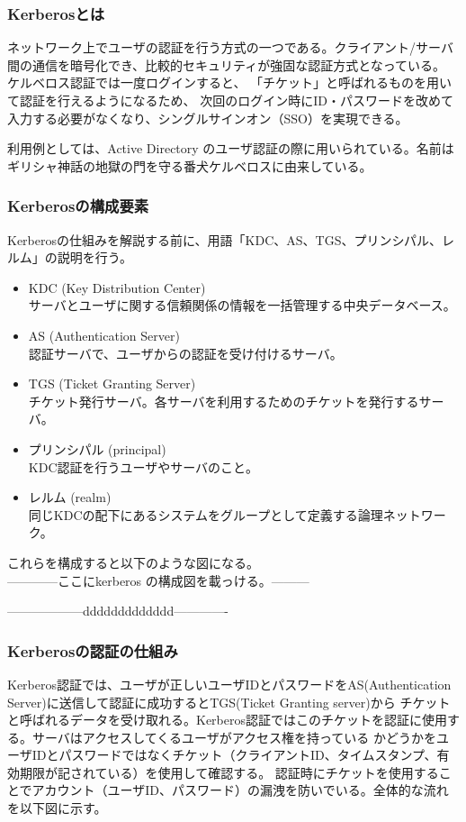 \documentclass[12pt,a4paper,titlepage]{jsarticle}
\begin{document}
\subsubsection*{Kerberosとは}
ネットワーク上でユーザの認証を行う方式の一つである。クライアント/サーバ間の通信を暗号化でき、比較的セキュリティが強固な認証方式となっている。
ケルベロス認証では一度ログインすると、
「チケット」と呼ばれるものを用いて認証を行えるようになるため、
次回のログイン時にID・パスワードを改めて入力する必要がなくなり、シングルサインオン（SSO）を実現できる。\par 
利用例としては、Active Directory のユーザ認証の際に用いられている。名前はギリシャ神話の地獄の門を守る番犬ケルベロスに由来している。

\subsubsection*{Kerberosの構成要素}
Kerberosの仕組みを解説する前に、用語「KDC、AS、TGS、プリンシパル、レルム」の説明を行う。

\begin{itemize}
    \item KDC (Key Distribution Center)\mbox{}\\サーバとユーザに関する信頼関係の情報を一括管理する中央データベース。
    \item AS (Authentication Server) \mbox{}\\認証サーバで、ユーザからの認証を受け付けるサーバ。
    \item TGS (Ticket Granting Server) \mbox{}\\チケット発行サーバ。各サーバを利用するためのチケットを発行するサーバ。
    \item プリンシパル (principal) \mbox{}\\ KDC認証を行うユーザやサーバのこと。
    \item レルム (realm)\mbox{}\\同じKDCの配下にあるシステムをグループとして定義する論理ネットワーク。
\end{itemize}
これらを構成すると以下のような図になる。
\\------------ここにkerberos の構成図を載っける。---------

------------------ddddddddddddd-------------

\subsubsection*{Kerberosの認証の仕組み}
Kerberos認証では、ユーザが正しいユーザIDとパスワードをAS(Authentication Server)に送信して認証に成功するとTGS(Ticket Granting server)から
チケットと呼ばれるデータを受け取れる。Kerberos認証ではこのチケットを認証に使用する。サーバはアクセスしてくるユーザがアクセス権を持っている
かどうかをユーザIDとパスワードではなくチケット（クライアントID、タイムスタンプ、有効期限が記されている）を使用して確認する。
認証時にチケットを使用することでアカウント（ユーザID、パスワード）の漏洩を防いでいる。全体的な流れを以下図に示す。
\end{document}
